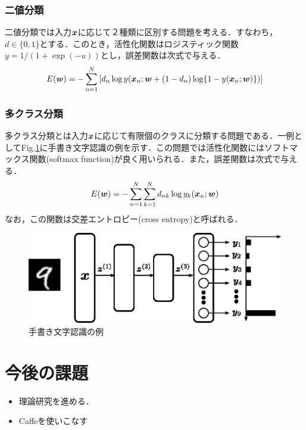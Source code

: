 \documentclass[a4paper,10pt]{jsarticle}
\def\vec#1{\mbox{\boldmath$#1$}}
\begin{document}
\subsubsection{二値分類}
二値分類では入力$\vec{x}$に応じて２種類に区別する問題を考える．すなわち，$d\in\{0,1\}$とする．このとき，活性化関数はロジスティック関数$y=1/(1+\exp(-u))$とし，誤差関数は次式で与える．
\begin{eqnarray}
 E(\vec{w})=-\sum^{N}_{n=1}\left[d_{n}\log y(\vec{x}_{n};\vec{w} + (1-d_{n})\log\{1-y(\vec{x}_{n};\vec{w})\})\right]\label{000654_27Jun15}
\end{eqnarray}

\subsubsection{多クラス分類}
多クラス分類とは入力$\vec{x}$に応じて有限個のクラスに分類する問題である．一例としてFig.\ref{010714_27Jun15}に手書き文字認識の例を示す．この問題では活性化関数にはソフトマックス関数(softmax function)が良く用いられる．また，誤差関数は次式で与える．
\begin{eqnarray}
 E(\vec{w})=-\sum^{N}_{n=1}\sum^{N}_{k=1}d_{nk}\log y_{k}(\vec{x}_{n};\vec{w})\label{000700_27Jun15}
\end{eqnarray}
なお，この関数は交差エントロピー(cross entropy)と呼ばれる．

\begin{figure}[htbp]
 	\centering
	\includegraphics[width=12cm]{./fig/eps/example_digits.eps}
	\caption{手書き文字認識の例}
	\label{010714_27Jun15}
\end{figure}

\section{今後の課題}
\begin{itemize}
 \item 理論研究を進める．
 \item Caffeを使いこなす
\end{itemize}
\end{document}

